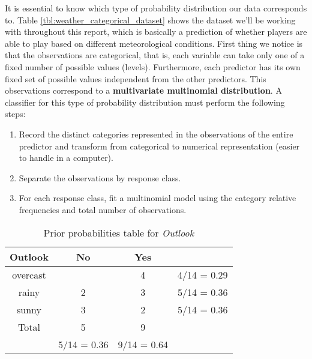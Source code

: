 It is essential to know which type of probability distribution our data corresponds to. Table \ref{tbl:weather_categorical_dataset} shows the dataset we'll be working with throughout this report, which is basically a prediction of whether players are able to play based on different meteorological conditions. First thing we notice is that the observations are categorical, that is, each variable can take only one of a fixed number of possible values (levels). Furthermore, each predictor has its own fixed set of possible values independent from the other predictors. This observations correspond to a \textbf{multivariate multinomial distribution}. A classifier for this type of probability distribution must perform the following steps:
\begin{enumerate}
	\item Record the distinct categories represented in the observations of       the entire predictor and transform from categorical to numerical representation (easier to handle in a computer).
	\item Separate the observations by response class.
	\item For each response class, fit a multinomial model using the category relative frequencies and total number of observations.
\end{enumerate}

\begin{table}[]
	\renewcommand{\arraystretch}{1.3}
	\caption{Prior probabilities table for \textit{Outlook}}
	\label{tbl:prior_table}
	\centering
	\begin{tabular}{|c|c|c||c|}
		\hline
		Outlook  & No & Yes & \\ \hline \hline
		overcast  &  & 4 & 4/14 = 0.29 \\ \hline
		rainy  & 2 & 3 & 5/14 = 0.36 \\ \hline
		sunny  & 3 & 2 & 5/14 = 0.36 \\ \hline
		Total  & 5 & 9 & \\ \hline \hline
		& 5/14 = 0.36 & 9/14 = 0.64 & \\ \hline
	\end{tabular}
\end{table}

